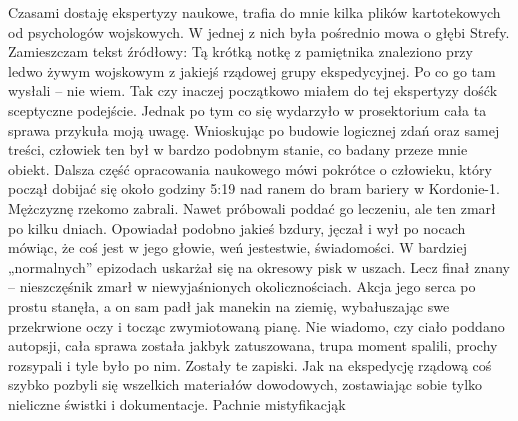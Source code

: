 \documentclass[../MAIN.tex]{subfiles}
\begin{document}
Czasami dostaję ekspertyzy naukowe, trafia do mnie kilka plików kartotekowych od psychologów wojskowych. W jednej z nich była pośrednio mowa o głębi Strefy. Zamieszczam tekst źródłowy:
\qpi
Tą krótką notkę z pamiętnika znaleziono przy ledwo żywym wojskowym z jakiejś rządowej grupy ekspedycyjnej. Po co go tam wysłali -- nie wiem. Tak czy inaczej początkowo miałem do tej ekspertyzy dość\3k sceptyczne podejście. Jednak po tym co się wydarzyło w prosektorium cała ta sprawa przykuła moją uwagę. Wnioskując po budowie logicznej zdań oraz samej treści, człowiek ten był w bardzo podobnym stanie, co badany przeze mnie obiekt. Dalsza część opracowania naukowego mówi pokrótce o człowieku, który począł dobijać się około godziny 5:19 nad ranem do bram bariery w Kordonie-1. Mężczyznę rzekomo zabrali. Nawet próbowali poddać go leczeniu, ale ten zmarł po kilku dniach. Opowiadał podobno jakieś bzdury, jęczał i wył po nocach mówiąc, że coś jest w jego głowie, weń jestestwie, świadomości. W bardziej „normalnych” epizodach uskarżał się na okresowy pisk w uszach. Lecz finał znany -- nieszczęśnik zmarł w niewyjaśnionych okolicznościach. Akcja jego serca po prostu stanęła, a on sam padł jak manekin na ziemię, 
wybałuszając 
swe przekrwione oczy i tocząc zwymiotowaną pianę. Nie wiadomo, czy ciało poddano autopsji, cała sprawa została jakby\3k zatuszowana, trupa moment spalili, prochy rozsypali i tyle było po nim. Zostały te zapiski. Jak na ekspedycję rządową coś szybko pozbyli się wszelkich materiałów dowodowych, zostawiając sobie tylko nieliczne świstki i dokumentacje. Pachnie mistyfikacją\3k
\end{document}
